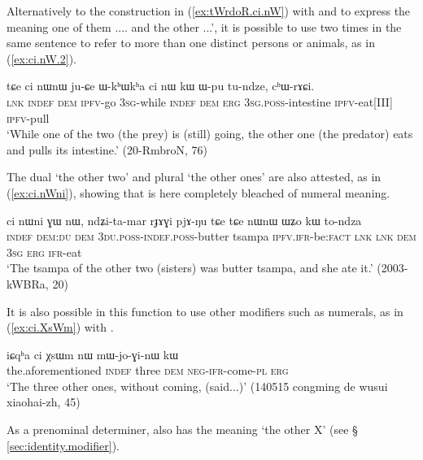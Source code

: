 Alternatively to the construction in (\ref{ex:tWrdoR.ci.nW}) with  and  to express the meaning one of them .... and the other ...', it is possible to use  two times in the same sentence to refer to more than one distinct persons or animals, as in (\ref{ex:ci.nW.2}).

\begin{exe}
\ex \label{ex:ci.nW.2}
 \gll tɕe ci nɯnɯ ju-ɕe ɯ-kʰɯkʰa ci nɯ kɯ ɯ-pu tu-ndze, cʰɯ-rɤɕi. \\
\textsc{lnk} \textsc{indef} \textsc{dem} \textsc{ipfv}-go \textsc{3sg}-while \textsc{indef} \textsc{dem} \textsc{erg} \textsc{3sg.poss}-intestine \textsc{ipfv}-eat[III] \textsc{ipfv}-pull \\
\glt `While one of the two (the prey) is (still) going, the other one (the predator) eats and pulls its intestine.'  (20-RmbroN, 76)
\end{exe}

The dual  `the other two' and plural  `the other ones' are also attested, as in (\ref{ex:ci.nWni}), showing that  is here completely bleached of numeral meaning.

 \begin{exe}
\ex \label{ex:ci.nWni}
 \gll  ci nɯni ɣɯ nɯ, ndʑi-ta-mar rɟɤɣi pjɤ-ŋu tɕe tɕe nɯnɯ ɯʑo kɯ to-ndza \\
\textsc{indef} \textsc{dem:du} \gen \textsc{dem} \textsc{3du}.\textsc{poss}-\textsc{indef}.\textsc{poss}-butter tsampa \textsc{ipfv}.\textsc{ifr}-be:\textsc{fact} \textsc{lnk} \textsc{lnk} \textsc{dem} \textsc{3sg} \textsc{erg} \textsc{ifr}-eat \\
\glt `The tsampa of the other two (sisters) was butter tsampa, and she ate it.' (2003-kWBRa, 20)
\end{exe}

It is also possible in this function to use other modifiers such as numerals, as in (\ref{ex:ci.XsWm}) with . 

 \begin{exe}
\ex \label{ex:ci.XsWm}
 \gll iɕqʰa ci χsɯm nɯ mɯ-jo-ɣi-nɯ kɯ  \\
 the.aforementioned \textsc{indef} three \textsc{dem} \textsc{neg}-\textsc{ifr}-come-\textsc{pl} \textsc{erg} \\
\glt `The three other ones, without coming, (said...)' (140515 congming de wusui xiaohai-zh, 45)
 \end{exe}

As a prenominal determiner,  also has the meaning `the other X' (see § \ref{sec:identity.modifier}).

